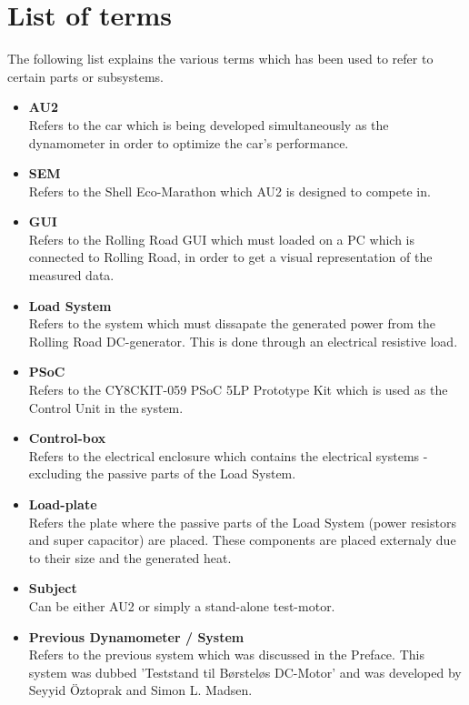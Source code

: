 \section{List of terms}
The following list explains the various terms which has been used to refer to certain parts or subsystems.
\begin{itemize}
	\item \textbf{AU2}\\
	Refers to the car which is being developed simultaneously as the dynamometer in order to optimize the car's performance.
	\item \textbf{SEM}\\
	Refers to the Shell Eco-Marathon which AU2 is designed to compete in.
	\item \textbf{GUI}\\
	Refers to the Rolling Road GUI which must loaded on a PC which is connected to Rolling Road, in order to get a visual representation of the measured data.
	\item \textbf{Load System}\\
	Refers to the system which must dissapate the generated power from the Rolling Road DC-generator. This is done through an electrical resistive load.
	\item \textbf{PSoC}\\
	Refers to the CY8CKIT-059 PSoC 5LP Prototype Kit which is used as the Control Unit in the system.
	\item \textbf{Control-box}\\
	Refers to the electrical enclosure which contains the electrical systems - excluding the passive parts of the Load System. 
	\item \textbf{Load-plate}\\
	Refers the plate where the passive parts of the Load System (power resistors and super capacitor) are placed. These components are placed externaly due to their size and the generated heat.
	\item \textbf{Subject}\\
	Can be either AU2 or simply a stand-alone test-motor.
	\item \textbf{Previous Dynamometer / System}\\
	Refers to the previous system which was discussed in the Preface. This system was dubbed 'Teststand til Børsteløs DC-Motor' and was developed by Seyyid Öztoprak and Simon L. Madsen.
\end{itemize}